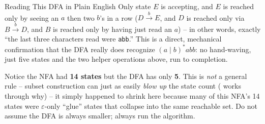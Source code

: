 \documentclass[full-course-notes.tex]{subfiles}
\begin{document}
\begin{center}
\end{center}

\begin{examplebox}{Reading This DFA in Plain English}
Only state $E$ is accepting, and $E$ is reached only by seeing an $a$ then two $b$'s in a row
($D \xrightarrow{b} E$, and $D$ is reached only via $B\xrightarrow{b}D$, and $B$ is reached only
by having just read an $a$) -- in other words, exactly ``the last three characters read were
\texttt{abb}.'' This is a direct, mechanical confirmation that the DFA really does recognize
$(a\mid b)^{*}abb$: no hand-waving, just five states and the two helper operations above, run to
completion.
\end{examplebox}

\begin{examfocus}
Notice the NFA had \textbf{14 states} but the DFA has only \textbf{5}. This is \emph{not} a
general rule -- subset construction can just as easily \emph{blow up} the state count
( works through why) -- it simply happened to shrink here
because many of this NFA's 14 states were $\varepsilon$-only ``glue'' states that collapse into
the same reachable set. Do not assume the DFA is always smaller; always run the algorithm.
\end{examfocus}
\end{document}
